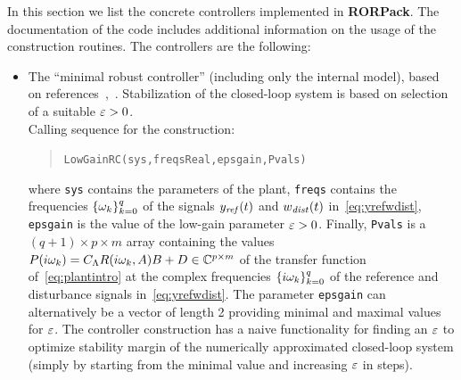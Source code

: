 \documentclass[11pt, a4paper]{amsart}
\newcommand{\CL}{C_\Lambda}
\theoremstyle{definition}
\numberwithin{equation}{section}
\newcommand{\yref}{y_{\mbox{\scriptsize\textit{ref}}}}
\newcommand{\wdist}{w_{\mbox{\scriptsize\textit{dist}}}}
\newcommand{\RORname}{\textbf{RORPack}}
\begin{document}
In this section we list the concrete controllers implemented in \RORname.
The documentation of the code includes additional information on the usage of the construction routines.
The controllers are the following:
\begin{itemize}
  \item The ``minimal robust controller'' (including only the internal model), based on references~\cite{HamPoh00},~. Stabilization of the closed-loop system is based on selection of a suitable  $\varepsilon>0$.\\[1ex]
      Calling sequence for the construction:\\[-1ex]
     \begin{quotation}
       \texttt{LowGainRC(sys,freqsReal,epsgain,Pvals)}
     \end{quotation}
     \medskip
     where \texttt{sys} contains the parameters of the plant, \texttt{freqs} contains the frequencies $\{\omega_k\}_{k=0}^q$ of the signals $\yref(t)$ and $\wdist(t)$ in~\eqref{eq:yrefwdist}, \texttt{epsgain} is the value of the low-gain parameter $\varepsilon>0$. Finally, \texttt{Pvals} is a $(q+1)\times p\times m$ array containing the values $P(i\gw_k)=\CL R(i\gw_k,A)B+D\in \C^{p\times m}$ of the transfer function of~\eqref{eq:plantintro} at the complex frequencies $\{i\omega_k\}_{k=0}^q$ of the reference and disturbance signals in~\eqref{eq:yrefwdist}.
     The parameter \texttt{epsgain} can alternatively be a vector of length 2 providing minimal and maximal values for $\varepsilon$. The controller construction has a naive functionality for finding an $\varepsilon$ to optimize stability margin of the numerically approximated closed-loop system (simply by starting from the minimal value and increasing $\varepsilon$ in steps). 

     \bigskip


\end{itemize}
\end{document}
